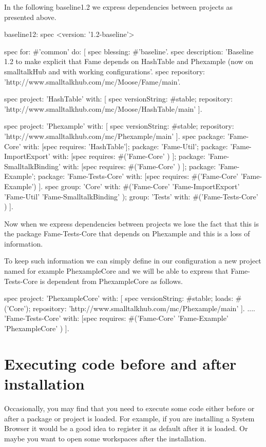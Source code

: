 \documentclass[a4paper,10pt,twoside]{book}
\begin{document}
In the following baseline1.2 we express dependencies between projects as presented above.
\begin{code}{}
baseline12: spec
	<version: '1.2-baseline'>

	spec for: #'common' do: [
		spec blessing: #'baseline'.
		spec description: 'Baseline 1.2 to make explicit that Fame depends on HashTable and Phexample (now on smalltalkHub and with working configurations'.
		spec repository: 'http://www.smalltalkhub.com/mc/Moose/Fame/main'.

		spec project: 'HashTable' with: [
				spec
					versionString: #stable;
					repository: 'http://www.smalltalkhub.com/mc/Moose/HashTable/main' ].

		spec project: 'Phexample' with: [
				spec
					versionString: #stable;
					repository: 'http://www.smalltalkhub.com/mc/Phexample/main' ].
		spec
			package: 'Fame-Core' with: [spec requires: 'HashTable'];
			package: 'Fame-Util';
			package: 'Fame-ImportExport' with: [spec requires: #('Fame-Core' ) ];
			package: 'Fame-SmalltalkBinding' with: [spec requires: #('Fame-Core' ) ];
			package: 'Fame-Example';
			package: 'Fame-Tests-Core' with: [spec requires: #('Fame-Core' 'Fame-Example') ].
		spec
			group: 'Core' with: #('Fame-Core' 'Fame-ImportExport' 'Fame-Util' 'Fame-SmalltalkBinding' );
			group: 'Tests' with: #('Fame-Tests-Core' ) ].
\end{code}

Now when we express dependencies between projects we lose the fact that this is the package Fame-Tests-Core that depends on Phexample and this is a loss of information.

To keep such information we can simply define in our configuration a new project named for example PhexampleCore and we will be able to express that Fame-Tests-Core is dependent from PhexampleCore as follows.


\begin{code}{}
spec
	project: 'PhexampleCore'
	with: [ spec
               versionString: #stable;
               loads: #('Core');
               repository: 'http://www.smalltalkhub.com/mc/Phexample/main' ].
	....
	'Fame-Tests-Core' with: [spec requires: #('Fame-Core' 'Fame-Example' 'PhexampleCore' ) ].
\end{code}


\section{Executing code before and after installation}
Occasionally, you may find that you need to execute some code either before or after a package or project is loaded. For example, if you are installing a System Browser it would be a good idea to register it as default after it is loaded. Or maybe you want to open some workspaces after the installation.
\end{document}
